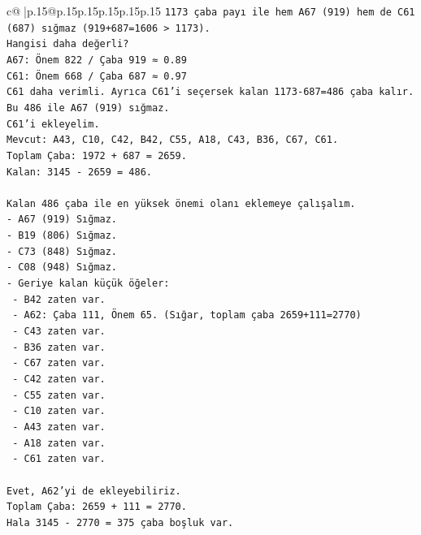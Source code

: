 \documentclass{article}
\begin{document}
{\begin{supertabular}{c@{$\;$}|p{.15\linewidth}@{}p{.15\linewidth}p{.15\linewidth}p{.15\linewidth}p{.15\linewidth}p{.15\linewidth}}
{{{\texttt{1173 çaba payı ile hem A67 (919) hem de C61 (687) sığmaz (919+687=1606 > 1173).} \\
\texttt{Hangisi daha değerli?} \\
\texttt{A67: Önem 822 / Çaba 919 ≈ 0.89} \\
\texttt{C61: Önem 668 / Çaba 687 ≈ 0.97} \\
\texttt{C61 daha verimli. Ayrıca C61'i seçersek kalan 1173{-}687=486 çaba kalır.} \\
\texttt{Bu 486 ile A67 (919) sığmaz.} \\
\texttt{C61'i ekleyelim.} \\
\texttt{Mevcut: A43, C10, C42, B42, C55, A18, C43, B36, C67, C61.} \\
\texttt{Toplam Çaba: 1972 + 687 = 2659.} \\
\texttt{Kalan: 3145 {-} 2659 = 486.} \\
\\ 
\texttt{Kalan 486 çaba ile en yüksek önemi olanı eklemeye çalışalım.} \\
\texttt{{-} A67 (919) Sığmaz.} \\
\texttt{{-} B19 (806) Sığmaz.} \\
\texttt{{-} C73 (848) Sığmaz.} \\
\texttt{{-} C08 (948) Sığmaz.} \\
\texttt{{-} Geriye kalan küçük öğeler:} \\
\texttt{  {-} B42 zaten var.} \\
\texttt{  {-} A62: Çaba 111, Önem 65. (Sığar, toplam çaba 2659+111=2770)} \\
\texttt{  {-} C43 zaten var.} \\
\texttt{  {-} B36 zaten var.} \\
\texttt{  {-} C67 zaten var.} \\
\texttt{  {-} C42 zaten var.} \\
\texttt{  {-} C55 zaten var.} \\
\texttt{  {-} C10 zaten var.} \\
\texttt{  {-} A43 zaten var.} \\
\texttt{  {-} A18 zaten var.} \\
\texttt{  {-} C61 zaten var.} \\
\\ 
\texttt{Evet, A62'yi de ekleyebiliriz.} \\
\texttt{Toplam Çaba: 2659 + 111 = 2770.} \\
\texttt{Hala 3145 {-} 2770 = 375 çaba boşluk var.} \\
}}}
\end{supertabular}}
\end{document}
